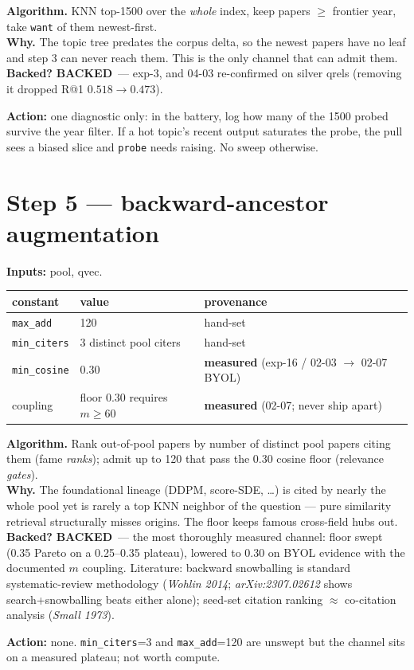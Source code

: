 \documentclass[10pt]{article}
\newenvironment{varbox}
  {\par\medskip\begin{lrbox}{\varboxsave}%
   \begin{minipage}{\dimexpr\linewidth-2\fboxsep\relax}\small\vspace{4pt}}
  {\vspace{4pt}\end{minipage}\end{lrbox}%
   \noindent\colorbox{boxbg}{\usebox{\varboxsave}}\par\medskip}
\newcommand{\backedyes}{\textcolor{green!50!black}{\textbf{BACKED}}}
\newcommand{\lit}[1]{\textcolor{blue!60!black}{\textit{#1}}}
\newcommand{\act}[1]{\par\smallskip\noindent\textbf{Action:} #1}
\begin{document}
\textbf{Algorithm.} KNN top-1500 over the \emph{whole} index, keep papers $\geq$ frontier
year, take \texttt{want} of them newest-first. \\
\textbf{Why.} The topic tree predates the corpus delta, so the newest papers have no leaf
and step 3 can never reach them. This is the only channel that can admit them. \\
\textbf{Backed?} \backedyes\ --- exp-3, and 04-03 re-confirmed on silver qrels (removing it
dropped R@1 $0.518 \to 0.473$). \\
\act{one diagnostic only: in the battery, log how many of the 1500 probed survive the year
filter. If a hot topic's recent output saturates the probe, the pull sees a biased slice
and \texttt{probe} needs raising. No sweep otherwise.}

\section{Step 5 --- backward-ancestor augmentation}
\textbf{Inputs:} pool, qvec.

\begin{varbox}
\begin{tabular}{@{}lll@{}}
\toprule
constant & value & provenance \\
\midrule
\texttt{max\_add} & 120 & hand-set \\
\texttt{min\_citers} & 3 distinct pool citers & hand-set \\
\texttt{min\_cosine} & 0.30 & \textbf{measured} (exp-16 / 02-03 $\to$ 02-07 BYOL) \\
coupling & floor 0.30 requires $m \geq 60$ & \textbf{measured} (02-07; never ship apart) \\
\bottomrule
\end{tabular}
\end{varbox}

\textbf{Algorithm.} Rank out-of-pool papers by number of distinct pool papers citing them
(fame \emph{ranks}); admit up to 120 that pass the 0.30 cosine floor (relevance
\emph{gates}). \\
\textbf{Why.} The foundational lineage (DDPM, score-SDE, \dots) is cited by nearly the whole
pool yet is rarely a top KNN neighbor of the question --- pure similarity retrieval
structurally misses origins. The floor keeps famous cross-field hubs out. \\
\textbf{Backed?} \backedyes\ --- the most thoroughly measured channel: floor swept (0.35
Pareto on a 0.25--0.35 plateau), lowered to 0.30 on BYOL evidence with the documented $m$
coupling. Literature: backward snowballing is standard systematic-review methodology
(\lit{Wohlin 2014}; \lit{arXiv:2307.02612} shows search+snowballing beats either alone);
seed-set citation ranking $\approx$ co-citation analysis (\lit{Small 1973}). \\
\act{none. \texttt{min\_citers}=3 and \texttt{max\_add}=120 are unswept but the channel
sits on a measured plateau; not worth compute.}
\end{document}
